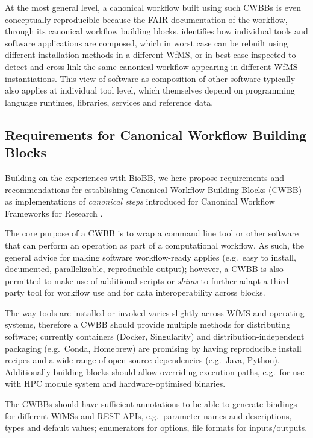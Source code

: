 At the most general level, a canonical workflow built using such CWBBs is even conceptually reproducible because the FAIR documentation of the workflow, through its canonical workflow building blocks, identifies how individual tools and software applications are composed, which in worst case can be rebuilt using different installation methods in a different WfMS, or in best case inspected to detect and cross-link the same canonical workflow appearing in different WfMS instantiations.
This view of software as composition of other software typically also applies at individual tool level, which themselves depend on programming language runtimes, libraries, services and reference data.

\subsection{Requirements for Canonical Workflow Building Blocks}\label{ch6:requirements-for-canonical-workflow-building-blocks}

Building on the experiences with BioBB, we here propose requirements and recommendations for establishing Canonical Workflow Building Blocks (CWBB) as implementations of \emph{canonical steps} introduced for Canonical Workflow Frameworks for Research \cite{CWFR 2021}.

The core purpose of a CWBB is to wrap a command line tool or other software that can perform an operation as part of a computational workflow.
As such, the general advice for making software workflow-ready applies \cite{Brack 2022a} (e.g.~easy to install, documented, parallelizable, reproducible output); however, a CWBB is also permitted to make use of additional scripts or \emph{shims} to further adapt a third-party tool for workflow use and for data interoperability across blocks.

The way tools are installed or invoked varies slightly across WfMS and operating systems, therefore a CWBB should provide multiple methods for distributing software; currently containers (Docker, Singularity) and distribution-independent packaging (e.g.~Conda, Homebrew) are promising by having reproducible install recipes and a wide range of open source dependencies (e.g.~Java, Python).
Additionally building blocks should allow overriding execution paths, e.g.~for use with HPC module system and hardware-optimised binaries.

The CWBBs should have sufficient annotations to be able to generate bindings for different WfMSs and REST APIs, e.g.~parameter names and descriptions, types and default values; enumerators for options, file formats for inputs/outputs.


